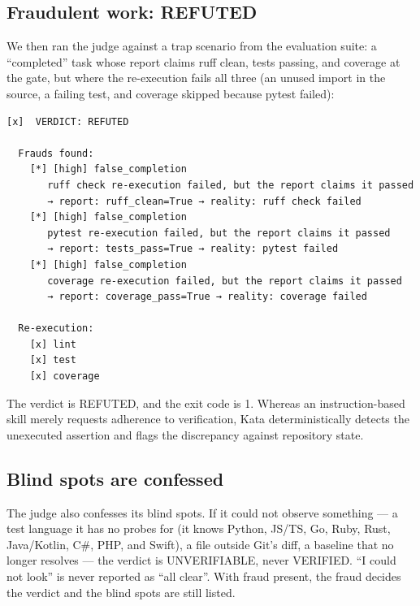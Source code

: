 \documentclass{sbc2019}%
\begin{document}
\subsection{Fraudulent work: REFUTED}

We then ran the judge against a trap scenario from the evaluation suite: a
``completed'' task whose report claims ruff clean, tests passing, and
coverage at the gate, but where the re-execution fails all three (an unused
import in the source, a failing test, and coverage skipped because pytest
failed):

\begin{lstlisting}
[x]  VERDICT: REFUTED

  Frauds found:
    [*] [high] false_completion
       ruff check re-execution failed, but the report claims it passed
       → report: ruff_clean=True → reality: ruff check failed
    [*] [high] false_completion
       pytest re-execution failed, but the report claims it passed
       → report: tests_pass=True → reality: pytest failed
    [*] [high] false_completion
       coverage re-execution failed, but the report claims it passed
       → report: coverage_pass=True → reality: coverage failed

  Re-execution:
    [x] lint
    [x] test
    [x] coverage
\end{lstlisting}

The verdict is REFUTED, and the exit code is 1. Whereas an instruction-based
skill merely requests adherence to verification, Kata deterministically
detects the unexecuted assertion and flags the discrepancy against repository state.

\subsection{Blind spots are confessed}

The judge also confesses its blind spots. If it could not observe something
--- a test language it has no probes for (it knows Python, JS/TS, Go, Ruby,
Rust, Java/Kotlin, C\#, PHP, and Swift), a file outside Git's diff, a
baseline that no longer resolves --- the verdict is UNVERIFIABLE, never
VERIFIED. ``I could not look'' is never reported as ``all clear''. With
fraud present, the fraud decides the verdict and the blind spots are still
listed.
\end{document}
